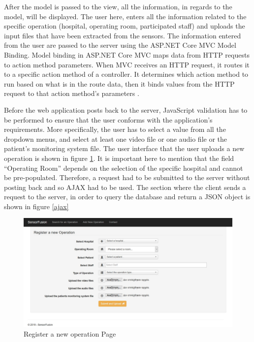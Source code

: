 After the model is passed to the view, all the information, in regards to the model, will be displayed. The user here, enters all the information related to the specific operation (hospital, operating room, participated staff) and uploads the input files that have been extracted from the sensors. The information entered from the user are passed to the server using the ASP.NET Core MVC Model Binding. Model binding in ASP.NET Core MVC maps data from HTTP requests to action method parameters. When MVC receives an HTTP request, it routes it to a specific action method of a controller. It determines which action method to run based on what is in the route data, then it binds values from the HTTP request to that action method's parameters \cite{modelBinding}.

Before the web application posts back to the server, JavaScript validation has to be performed to ensure that the user conforms with the application's requirements. More specifically, the user has to select a value from all the dropdown menus, and select at least one video file or one audio file or the patient's monitoring system file. The user interface that the user uploads a new operation is shown in figure \ref{new_operation_page}. It is important here to mention that the field ``Operating Room'' depends on the selection of the specific hospital and cannot be pre-populated. Therefore, a request had to be submitted to the server without posting back and so AJAX had to be used. The section where the client sends a request to the server, in order to query the database and return a JSON object is shown in figure \ref{ajax}


\begin{figure}[!ht]
\begin{center}
\includegraphics[width=17cm]{imgs/new_operation_page.jpg}
\end{center}\vspace{-0.3cm}
\caption[Register a new operation Page]{Register a new operation Page} \label{new_operation_page}
\end{figure}

